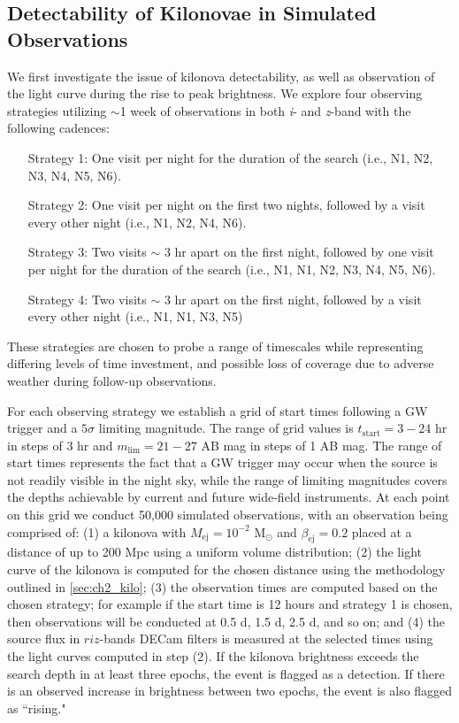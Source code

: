 \subsection{Detectability of Kilonovae in Simulated Observations}
\label{sec:ch2_MCsims_det}
We first investigate the issue of kilonova detectability, as well as observation of the light curve during the rise to peak brightness. We explore four observing strategies utilizing $\sim$1 week of observations in both {\em i}- and {\em z}-band with the following cadences:
{\small \begin{enumerate}[leftmargin = 2.5cm]
\item[Strategy 1:] One visit per night for the duration of the search (i.e., N1, N2, N3, N4, N5, N6).
\item[Strategy 2:]  One visit per night on the first two nights, followed by a visit every other night (i.e., N1, N2, N4, N6).
\item[Strategy 3:]  Two visits $\sim$ 3 hr apart on the first night, followed by one visit per night for the duration of the search (i.e., N1, N1, N2, N3, N4, N5, N6).
\item[Strategy 4:]  Two visits $\sim$ 3 hr apart on the first night, followed by a visit every other night (i.e., N1, N1, N3, N5)
\end{enumerate}}

\clearpage
These strategies are chosen to probe a range of timescales while representing differing levels of time investment, and possible loss of coverage due to adverse weather during follow-up observations.

For each observing strategy we establish a grid of start times following a GW trigger and a $5\sigma$ limiting magnitude. The range of grid values is $t_{\text{start}} = 3-24$ hr in steps of 3 hr and $m_{\text{lim}} = 21-27$ AB mag in steps of 1 AB mag. The range of start times represents the fact that a GW trigger may occur when the source is not readily visible in the night sky, while the range of limiting magnitudes covers the depths achievable by current and future wide-field instruments. At each point on this grid we conduct 50,000 simulated observations, with an observation being comprised of: (1) a kilonova with $M_{\text{ej}} = 10^{-2} \text{ M}_{\odot}$ and $\beta_{\text{ej}} = 0.2$ placed at a distance of up to 200 Mpc using a uniform volume distribution; (2) the light curve of the kilonova is computed for the chosen distance using the methodology outlined in \cref{sec:ch2_kilo}; (3) the observation times are computed based on the chosen strategy; for example if the start time is 12 hours and strategy 1 is chosen, then observations will be conducted at 0.5 d, 1.5 d, 2.5 d, and so on; and (4) the source flux in $riz$-bands DECam filters is measured at the selected times using the light curves computed in step (2). If the kilonova brightness exceeds the search depth in at least three epochs, the event is flagged as a detection. If there is an observed increase in brightness between two epochs, the event is also flagged as ``rising."

